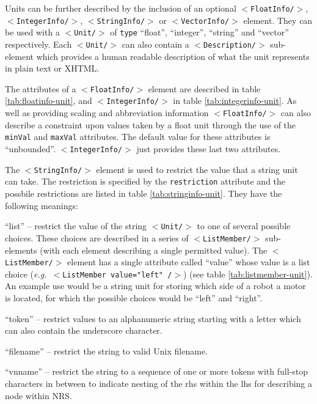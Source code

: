 \documentclass[pdftex,a4paper]{article}
\newcommand{\eg}{{\em e.g.\ }}
\newcommand{\XML}[2][]{{\tt \small $<$#2#1/$>$}}
\newcommand{\XMLfont}[1]{{\tt \small #1}}
\begin{document}
Units can be further described by the inclusion of an optional
\XML{FloatInfo}, \XML{IntegerInfo}, \XML{StringInfo} or
\XML{VectorInfo} element. They can be used with a \XML{Unit} of
\XMLfont{type} ``float'', ``integer'', ``string'' and ``vector''
respectively.  Each \XML{Unit} can also contain a \XML{Description}
sub-element which provides a human readable description of what the
unit represents in plain text or XHTML.

The attributes of a \XML{FloatInfo} element are described in table
\ref{tab:floatinfo-unit}, and \XML{IntegerInfo} in table
\ref{tab:integerinfo-unit}. As well as providing scaling and
abbreviation information \XML{FloatInfo} can also describe a
constraint upon values taken by a float unit through the use of the
\XMLfont{minVal} and \XMLfont{maxVal} attributes. The default value
for these attributes is ``unbounded''. \XML{IntegerInfo} just provides
these last two attributes.

The \XML{StringInfo} element is used to restrict the value that a string
unit can take. The restriction is specified by the \XMLfont{restriction}
attribute and the possbile restrictions are listed in table
\ref{tab:stringinfo-unit}. They have the following meanings:

\begin{description}
\item{``list''} -- restrict the value of the string \XML{Unit} to one of
  several possible choices. These choices are described in a series of
  \XML{ListMember} sub-elements (with each element describing a single
  permitted value). The \XML{ListMember} element has a single attribute
  called ``value'' whose value is a list choice (\eg \XML[ value="left"
  ]{ListMember}) (see table \ref{tab:listmember-unit}). An example use
  would be a string unit for storing which side of a robot a motor is
  located, for which the possible choices would be ``left'' and
  ``right''.

\item{``token''} -- restrict values to an alphanumeric string starting
      with a letter which can also contain the underscore character.

\item{``filename''} -- restrict the string to valid Unix filename.

\item{``vnname''} -- restrict the string to a sequence of one or more
      tokens with full-stop characters in between to indicate nesting of
      the rhs within the lhs for describing a node within NRS.
\end{description}
\end{document}
